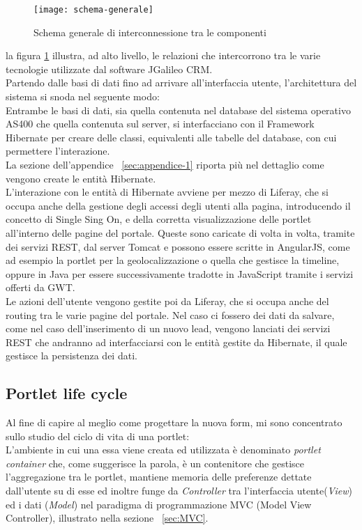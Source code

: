 \begin{figure}[h]
	\centering
	\texttt{[image: schema-generale]}
	\caption{Schema generale di interconnessione tra le componenti}
	\label{schema-generale}
\end{figure}
la figura \ref{schema-generale} illustra, ad alto livello, le relazioni che intercorrono tra le varie tecnologie utilizzate dal software JGalileo CRM.\\
Partendo dalle basi di dati fino ad arrivare all'interfaccia utente, l'architettura del sistema si snoda nel seguente modo:\\
Entrambe le basi di dati, sia quella contenuta nel database del sistema operativo AS400 che quella contenuta sul server, si interfacciano con il Framework Hibernate per creare delle classi, equivalenti alle tabelle del database, con cui permettere l'interazione.\\ 
La sezione dell'appendice ~\ref{sec:appendice-1} riporta più nel dettaglio come vengono create le entità Hibernate.\\
L'interazione con le entità di Hibernate avviene per mezzo di Liferay, che si occupa anche della gestione degli accessi degli utenti alla pagina, introducendo il concetto di Single Sing On, e della corretta visualizzazione delle \gls{portlet} all'interno delle pagine del portale. Queste sono caricate di volta in volta, tramite dei servizi REST, dal server Tomcat e possono essere scritte in AngularJS, come ad esempio la \gls{portlet} per la geolocalizzazione o quella che gestisce la timeline, oppure in Java per essere successivamente tradotte in JavaScript tramite i servizi offerti da GWT.\\
Le azioni dell'utente vengono gestite poi da Liferay, che si occupa anche del routing tra le varie pagine del portale. Nel caso ci fossero dei dati da salvare, come nel caso dell'inserimento di un nuovo lead, vengono lanciati dei servizi REST che andranno ad interfacciarsi con le entità gestite da Hibernate, il quale gestisce la persistenza dei dati.\\

\subsection{Portlet life cycle}
Al fine di capire al meglio come progettare la nuova form, mi sono concentrato sullo studio del ciclo di vita di una \gls{portlet}:\\
L'ambiente in cui una essa viene creata ed utilizzata è denominato \emph{portlet container} che, come suggerisce la parola, è un contenitore che gestisce l'aggregazione tra le \gls{portlet}, mantiene memoria delle preferenze dettate dall'utente su di esse ed inoltre funge da \emph{Controller} tra l'interfaccia utente(\emph{View}) ed i dati (\emph{Model}) nel paradigma di programmazione MVC (Model View Controller), illustrato nella sezione ~\ref{sec:MVC}.\\

